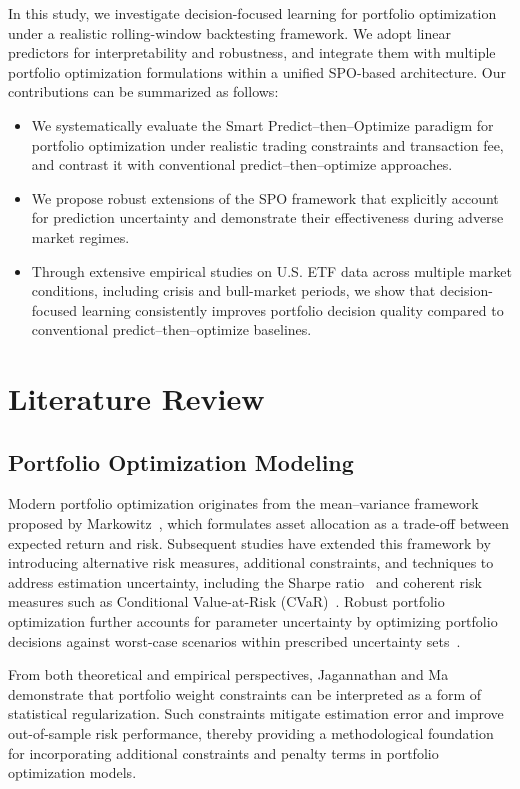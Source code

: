 \documentclass[review]{elsarticle}
\begin{document}
In this study, we investigate decision-focused learning for portfolio
optimization under a realistic rolling-window backtesting framework. We adopt
linear predictors for interpretability and robustness, and integrate them with
multiple portfolio optimization formulations within a unified SPO-based
architecture. Our contributions can be summarized as follows:
\begin{itemize}
    \item We systematically evaluate the Smart Predict--then--Optimize paradigm for portfolio optimization under realistic trading constraints and transaction fee, and contrast it with conventional predict--then--optimize approaches.
    \item We propose robust extensions of the SPO framework that explicitly
    account for prediction uncertainty and demonstrate their effectiveness
    during adverse market regimes.
    \item Through extensive empirical studies on U.S. ETF data across multiple
    market conditions, including crisis and bull-market periods, we show that
    decision-focused learning consistently improves portfolio decision quality
    compared to conventional predict--then--optimize baselines.
\end{itemize}


\section{Literature Review}

\subsection{Portfolio Optimization Modeling}

Modern portfolio optimization originates from the mean--variance framework
proposed by Markowitz~\cite{markowitz1952portfolio}, which formulates asset
allocation as a trade-off between expected return and risk.
Subsequent studies have extended this framework by introducing alternative
risk measures, additional constraints, and techniques to address estimation
uncertainty, including the Sharpe ratio~\cite{sharpe1998sharpe} and
coherent risk measures such as Conditional Value-at-Risk (CVaR)~\cite{Rockafellar2000Cvar}.
Robust portfolio optimization further accounts for parameter uncertainty by
optimizing portfolio decisions against worst-case scenarios within prescribed
uncertainty sets~\cite{goldfarb2003robust}.

From both theoretical and empirical perspectives, Jagannathan and Ma~\cite{Jagannathan2003constraints}
demonstrate that portfolio weight constraints can be interpreted as a form of
statistical regularization.
Such constraints mitigate estimation error and improve out-of-sample risk
performance, thereby providing a methodological foundation for incorporating
additional constraints and penalty terms in portfolio optimization models.
\end{document}
